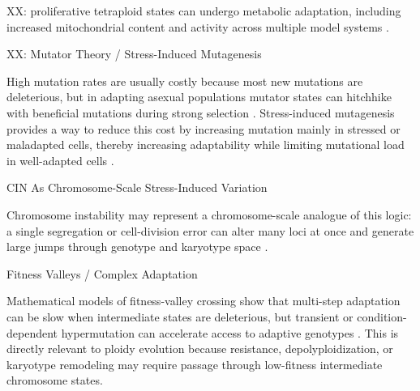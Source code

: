 \documentclass[11pt]{article}
\begin{document}
XX: proliferative tetraploid states can undergo metabolic adaptation, including increased mitochondrial content and activity across multiple model systems \cite{jemaa_mitochondrial_2026}.

XX:  Mutator Theory / Stress-Induced Mutagenesis

  High mutation rates are usually costly because most new mutations are deleterious, but in adapting asexual populations mutator states can hitchhike with beneficial mutations during strong selection
  \cite{Sniegowski1997Nature,KesslerLevine1997MutatorDynamics}. Stress-induced mutagenesis provides a way to reduce this cost by increasing mutation mainly in stressed or maladapted cells, thereby increasing
  adaptability while limiting mutational load in well-adapted cells \cite{Fitzgerald2017StressInducedMutagenesis,RamHadany2014SIMComplexAdaptation,Swings2017AdaptiveTuning}.

  CIN As Chromosome-Scale Stress-Induced Variation

  Chromosome instability may represent a chromosome-scale analogue of this logic: a single segregation or cell-division error can alter many loci at once and generate large jumps through genotype and karyotype
  space \cite{Umbreit2020SingleCellDivisionError,Watkins2020KaryotypeOrder}.

  Fitness Valleys / Complex Adaptation

  Mathematical models of fitness-valley crossing show that multi-step adaptation can be slow when intermediate states are deleterious, but transient or condition-dependent hypermutation can accelerate access to
  adaptive genotypes \cite{Weissman2009FitnessValleys,RamHadany2014SIMComplexAdaptation}. This is directly relevant to ploidy evolution because resistance, depolyploidization, or karyotype remodeling may require
  passage through low-fitness intermediate chromosome states.
\end{document}

